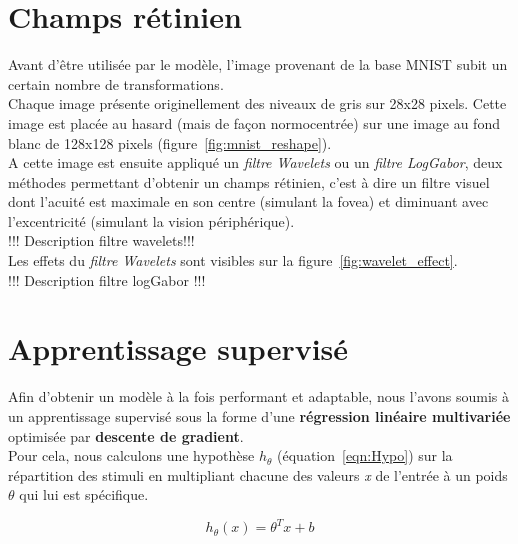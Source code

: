 
\section{Champs rétinien} %

Avant d'être utilisée par le modèle, l'image provenant de la base MNIST subit un certain nombre de transformations.\\
Chaque image présente originellement des niveaux de gris sur 28x28 pixels. Cette image est placée au hasard (mais de façon normocentrée) sur une image au fond blanc de 128x128 pixels (figure~\ref{fig:mnist_reshape}).\\
A cette image est ensuite appliqué un \textit{filtre Wavelets} ou un \textit{filtre LogGabor}, deux méthodes permettant d'obtenir un champs rétinien, c'est à dire un filtre visuel dont l'acuité est maximale en son centre (simulant la fovea) et diminuant avec l'excentricité (simulant la vision périphérique).\\
!!! Description filtre wavelets!!! \\
Les effets du \textit{filtre Wavelets} sont visibles sur la figure~\ref{fig:wavelet_effect}.\\
!!! Description filtre logGabor !!!


\section{Apprentissage supervisé} %

Afin d'obtenir un modèle à la fois performant et adaptable, nous l'avons soumis à un apprentissage supervisé sous la forme d'une \textbf{régression linéaire multivariée} optimisée par \textbf{descente de gradient}.\\
Pour cela, nous calculons une hypothèse $h_{\theta}$ (équation~\ref{eqn:Hypo}) sur la répartition des stimuli en multipliant chacune des valeurs \textit{x} de l'entrée à un poids $\theta$ qui lui est spécifique.

\begin{equation}
h_{\theta}(x) = \theta^{T}x + b
\label{eqn:Hypo}
\end{equation}


